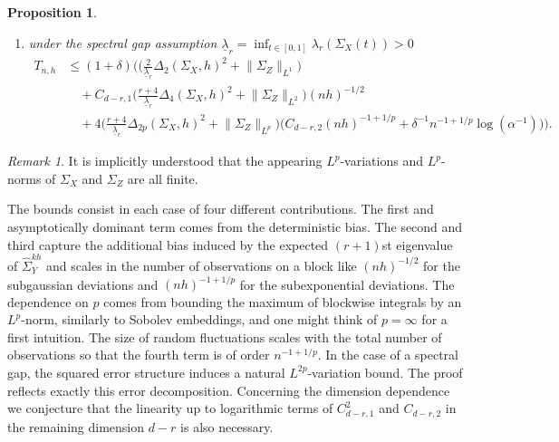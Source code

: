 \documentclass[preprint,aos]{imsart}
\numberwithin{equation}{section}
\newtheorem{proposition}[satz]{Proposition}
\theoremstyle{remark}
\newtheorem{remark}[satz]{Remark}
\providecommand{\norm}[1]{\lVert #1 \rVert}
\renewcommand{\le}{\leqslant}
\begin{document}
\begin{appendix}
\begin{proposition}
\begin{enumerate}
\item under the spectral gap assumption $\underline\lambda_{r}=\inf_{t\in[0,1]}\lambda_r(\Sigma_X(t))>0$
\begin{align*}
T_{n,h}
 &\le (1+\delta)\Big( \big(\tfrac{2}{\underline\lambda_r}\Delta_2(\Sigma_{X},h)^2+\norm{\Sigma_{Z}}_{L^1}\big)\\
 &\quad
  +C_{d-r,1} \big(\tfrac{r+4}{\underline\lambda_r }  \Delta_4(\Sigma_X,h)^{2} + \norm{\Sigma_Z}_{L^2}\big)(nh)^{-1/2}\\
 &\quad +4\big(\tfrac{r+4}{\underline\lambda_r }\Delta_{2p}(\Sigma_X,h)^2+\norm{\Sigma_Z}_{L^{p}}\big)\big(C_{d-r,2}(nh)^{-1+1/p}+\delta^{-1}n^{-1+1/p}\log(\alpha^{-1})\big) \Big).
\end{align*}

\end{enumerate}
\end{proposition}

\begin{remark}
It is implicitly understood that the appearing $L^p$-variations and $L^p$-norms of $\Sigma_X$ and $\Sigma_Z$ are all  finite.

The bounds consist in each case of four different contributions. The first and asymptotically dominant term comes from the deterministic bias. The second and third  capture the additional bias induced by the expected $(r+1)$st eigenvalue of $\hat\Sigma^{kh}_Y$ and scales in the number of observations on a block like $(nh)^{-1/2}$ for the subgaussian deviations and $(nh)^{-1+1/p}$ for the subexponential deviations. The dependence on $p$ comes from bounding the maximum of blockwise integrals by an $L^p$-norm, similarly to Sobolev embeddings, and one might think of $p=\infty$ for a first intuition. The size of random fluctuations scales with the total number of observations so that the fourth term is  of order  $n^{-1+1/p}$. In the case of a spectral gap, the squared error structure induces a natural $L^{2p}$-variation bound. The proof reflects exactly this error decomposition. Concerning the dimension dependence we conjecture that the linearity up to logarithmic terms of $C_{d-r,1}^2$ and $C_{d-r,2}$ in the remaining dimension $d-r$ is also necessary.
\end{remark}


\end{appendix}
\end{document}
